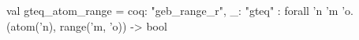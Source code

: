 val gteq_atom_range = {coq: "geb_range_r", _: "gteq"} : forall 'n 'm 'o. (atom('n), range('m, 'o)) -> bool
